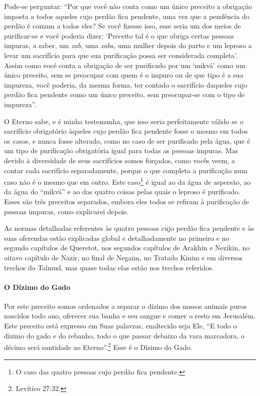 Pode-se perguntar: ``Por que você não conta como um único preceito a
obrigação imposta a todos aqueles cujo perdão fica pendente, uma vez que
a pendência do perdão é comum a todos eles? Se você fizesse isso, esse
seria um dos meios de purificar-se e você poderia dizer: `Preceito tal é
o que obriga certas pessoas impuras, a saber, um \emph{zab}, uma
\emph{zaba}, uma mulher depois do parto e um leproso a levar um
sacrifício para que sua purificação possa ser considerada completa'.
Assim como você conta a obrigação de ser purificado por um `mikvá' como
um único preceito, sem se preocupar com quem é o impuro ou de que tipo é
a sua impureza, você poderia, da mesma forma, ter contado o sacrifício daqueles cujo perdão fica pendente como um único
preceito, sem preocupar-se com o tipo de impureza''.

O Eterno sabe, e é minha testemunha, que isso seria perfeitamente válido
se o sacrifício obrigatório àqueles cujo perdão fica pendente fosse o
mesmo em todos os casos, e nunca fosse alterado, como no caso de ser
purificado pela água, que é um tipo de purificação obrigatória igual
para todas as pessoas impuras. Mas devido à diversidade de seus
sacrifícios somos forçados, como vocês veem, a contar cada sacrifício
separadamente, porque o que completa a purificação num caso não é o
mesmo que em outro. Este caso\footnote{O caso das quatro pessoas cujo perdão fica pendente.} é igual ao da água
de aspersão, ao da água do ``mikvá'' e ao das quatro coisas pelas quais
o leproso é purificado. Esses são três preceitos separados, embora eles
todos se refiram à purificação de pessoas impuras, como explicarei
depois.

As normas detalhadas referentes às quatro pessoas cujo perdão fica
pendente e às suas oferendas estão explicadas global e detalhadamente no
primeiro e no segundo capítulos de Queretot, nos segundos capítulos de
Arakhin e Nezikin, no oitavo capítulo de Nazir, no final de Negaim, no
Tratado Kinim e em diversos trechos do Talmud, mas quase todas elas
estão nos trechos referidos.

\paragraph{O Dízimo do Gado}

Por este preceito somos ordenados a separar o dízimo dos nossos animais
puros nascidos todo ano, oferecer sua banha e seu sangue e comer o resto
em Jerusalém. Este preceito está expresso em Suas palavras, enaltecido
seja Ele, ``E todo o dízimo do gado e do rebanho, todo o que passar
debaixo da vara marcadora, o décimo será santidade ao Eterno''.\footnote{Levítico 27:32.} Esse é o Dízimo do Gado.


